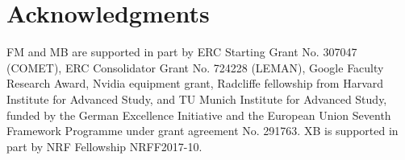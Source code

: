 \documentclass{article}
\begin{document}
\section{Acknowledgments}
FM and MB are supported in part by ERC Starting Grant No. 307047 (COMET), ERC Consolidator Grant No. 724228 (LEMAN), Google Faculty Research Award, Nvidia equipment grant, Radcliffe fellowship from Harvard Institute for Advanced Study, and TU Munich Institute for Advanced Study, funded by the German Excellence Initiative and the European Union Seventh Framework Programme under grant agreement No. 291763. XB is supported in part by NRF Fellowship NRFF2017-10. 




\end{document}
